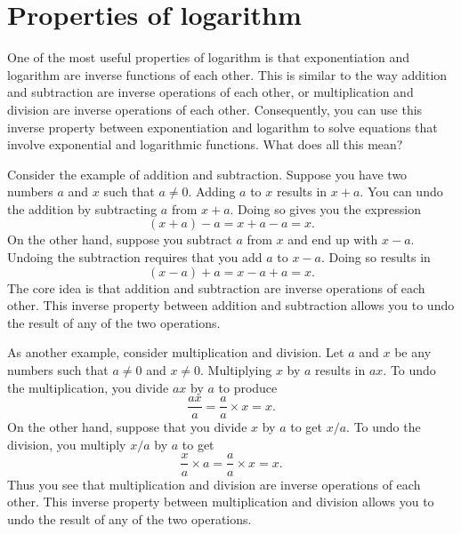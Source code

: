 \documentclass[a4paper,oneside,12pt]{article}
\begin{document}

\section{Properties of logarithm}

One of the most useful properties of logarithm is that exponentiation
and logarithm are inverse functions of each other.  This is similar to
the way addition and subtraction are inverse operations of each other,
or multiplication and division are inverse operations of each other.
Consequently, you can use this inverse property between exponentiation
and logarithm to solve equations that involve exponential and
logarithmic functions.  What does all this mean?

Consider the example of addition and subtraction.  Suppose you have
two numbers $a$ and $x$ such that $a \neq 0$.  Adding $a$ to $x$
results in $x + a$.  You can undo the addition by subtracting $a$ from
$x + a$.  Doing so gives you the expression
\[
(x + a) - a
=
x + a - a
=
x.
\]
On the other hand, suppose you subtract $a$ from $x$ and end up with
$x - a$.  Undoing the subtraction requires that you add $a$ to
$x - a$.  Doing so results in
\[
(x - a) + a
=
x - a + a
=
x.
\]
The core idea is that addition and subtraction are inverse operations
of each other.  This inverse property between addition and subtraction
allows you to undo the result of any of the two operations.

As another example, consider multiplication and division.  Let $a$ and
$x$ be any numbers such that $a \neq 0$ and $x \neq 0$.  Multiplying
$x$ by $a$ results in $ax$.  To undo the multiplication, you divide
$ax$ by $a$ to produce
\[
\frac{ax}{a}
=
\frac{a}{a} \times x
=
x.
\]
On the other hand, suppose that you divide $x$ by $a$ to get $x / a$.
To undo the division, you multiply $x / a$ by $a$ to get
\[
\frac{x}{a} \times a
=
\frac{a}{a} \times x
=
x.
\]
Thus you see that multiplication and division are inverse operations
of each other.  This inverse property between multiplication and
division allows you to undo the result of any of the two operations.
\end{document}
